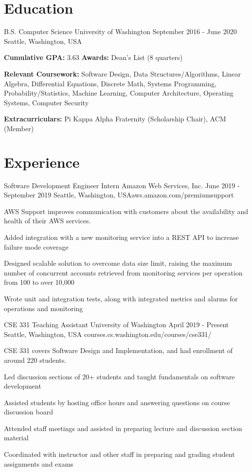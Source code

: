 \documentclass{resume}
\begin{document}
\maketitle

\section{Education}

\school
{B.S. Computer Science}
{University of Washington}
{September 2016 - June 2020}
{Seattle, Washington, USA}
{\textbf{Cumulative GPA:} 3.63 \blt \textbf{Awards:} Dean's List (8 quarters)

  \textbf{Relevant Coursework:} Software Design, Data Structures/Algorithms, 
  Linear Algebra, Differential Equations, Discrete Math, Systems Programming,
  Probability/Statistics, Machine Learning, Computer Architecture, Operating 
  Systems, Computer Security

  \textbf{Extracurriculars:} Pi Kappa Alpha Fraternity (Scholarship Chair), 
  ACM (Member)
}

\section{Experience}

\job
{Software Development Engineer Intern}
{Amazon Web Services, Inc.}
{June 2019 - September 2019}
{Seattle, Washington, USA}{aws.amazon.com/premiumsupport}
{
  AWS Support improves communication with customers about the availability 
  and health of their AWS services.
  \begin{overview}
    \item Added integration with a new monitoring service into a REST API to 
          increase failure mode coverage
    \item Designed scalable solution to overcome data size limit, raising the 
          maximum number of concurrent accounts retrieved from monitoring services 
          per operation from 100 to over 10,000
    \item Wrote unit and integration tests, along with integrated metrics and 
          alarms for operations and monitoring
  \end{overview}
}

\job
{CSE 331 Teaching Assistant}
{University of Washington}
{April 2019 - Present}
{Seattle, Washington, USA}
{courses.cs.washington.edu/courses/cse331/}
{
  CSE 331 covers Software Design and Implementation, and had enrollment of around 220 students.
  \begin{overview}
    \item Led discussion sections of 20+ students and taught fundamentals on
          software development
    \item Assisted students by hosting office hours and answering questions on 
          course discussion board
    \item Attended staff meetings and assisted in preparing lecture and 
          discussion section material
    \item Coordinated with instructor and other staff in preparing and grading 
          student assignments and exams
  \end{overview}
}
\end{document}
